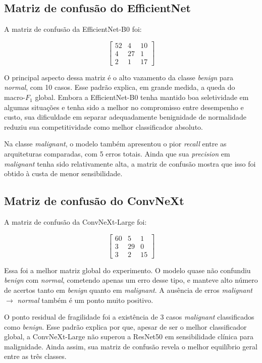 \documentclass[tcc,capa]{texufpel}
\begin{document}
\subsection{Matriz de confusão do EfficientNet}

A matriz de confusão da EfficientNet-B0 foi:

\[
\begin{bmatrix}
	52 & 4 & 10 \\
	4 & 27 & 1 \\
	2 & 1 & 17
\end{bmatrix}
\]

O principal aspecto dessa matriz é o alto vazamento da classe \textit{benign} para \textit{normal}, com 10 casos. Esse padrão explica, em grande medida, a queda do macro-\(F_1\) global. Embora a EfficientNet-B0 tenha mantido boa seletividade em algumas situações e tenha sido a melhor no compromisso entre desempenho e custo, sua dificuldade em separar adequadamente benignidade de normalidade reduziu sua competitividade como melhor classificador absoluto.

Na classe \textit{malignant}, o modelo também apresentou o pior \textit{recall} entre as arquiteturas comparadas, com 5 erros totais. Ainda que sua \textit{precision} em \textit{malignant} tenha sido relativamente alta, a matriz de confusão mostra que isso foi obtido à custa de menor sensibilidade.

\subsection{Matriz de confusão do ConvNeXt}

A matriz de confusão da ConvNeXt-Large foi:

\[
\begin{bmatrix}
	60 & 5 & 1 \\
	3 & 29 & 0 \\
	3 & 2 & 15
\end{bmatrix}
\]

Essa foi a melhor matriz global do experimento. O modelo quase não confundiu \textit{benign} com \textit{normal}, cometendo apenas um erro desse tipo, e manteve alto número de acertos tanto em \textit{benign} quanto em \textit{malignant}. A ausência de erros \textit{malignant} \(\rightarrow\) \textit{normal} também é um ponto muito positivo.

O ponto residual de fragilidade foi a existência de 3 casos \textit{malignant} classificados como \textit{benign}. Esse padrão explica por que, apesar de ser o melhor classificador global, a ConvNeXt-Large não superou a ResNet50 em sensibilidade clínica para malignidade. Ainda assim, sua matriz de confusão revela o melhor equilíbrio geral entre as três classes.
\end{document}
